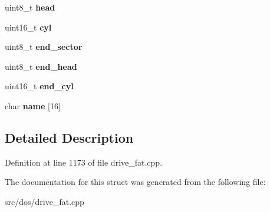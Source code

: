 \begin{DoxyCompactItemize}
\item 
\hypertarget{struct__PC98RawPartition_a159d590fdf1918ef8ba4fa37ffbb896d}{uint8\-\_\-t {\bfseries head}}\label{struct__PC98RawPartition_a159d590fdf1918ef8ba4fa37ffbb896d}

\item 
\hypertarget{struct__PC98RawPartition_ac1a8dc3e314587ea5bceb09b1d960643}{uint16\-\_\-t {\bfseries cyl}}\label{struct__PC98RawPartition_ac1a8dc3e314587ea5bceb09b1d960643}

\item 
\hypertarget{struct__PC98RawPartition_ae9213f512993e8dd4fdbe2409ef3a402}{uint8\-\_\-t {\bfseries end\-\_\-sector}}\label{struct__PC98RawPartition_ae9213f512993e8dd4fdbe2409ef3a402}

\item 
\hypertarget{struct__PC98RawPartition_ad005cde8a52522ccc7efc9e7aa97db80}{uint8\-\_\-t {\bfseries end\-\_\-head}}\label{struct__PC98RawPartition_ad005cde8a52522ccc7efc9e7aa97db80}

\item 
\hypertarget{struct__PC98RawPartition_a23df046ffa51a15203ef87662debd38b}{uint16\-\_\-t {\bfseries end\-\_\-cyl}}\label{struct__PC98RawPartition_a23df046ffa51a15203ef87662debd38b}

\item 
\hypertarget{struct__PC98RawPartition_ac3401e613d79b53415085b2a53c34fab}{char {\bfseries name} \mbox{[}16\mbox{]}}\label{struct__PC98RawPartition_ac3401e613d79b53415085b2a53c34fab}

\end{DoxyCompactItemize}


\subsection{Detailed Description}


Definition at line 1173 of file drive\-\_\-fat.\-cpp.



The documentation for this struct was generated from the following file\-:\begin{DoxyCompactItemize}
\item 
src/dos/drive\-\_\-fat.\-cpp\end{DoxyCompactItemize}

